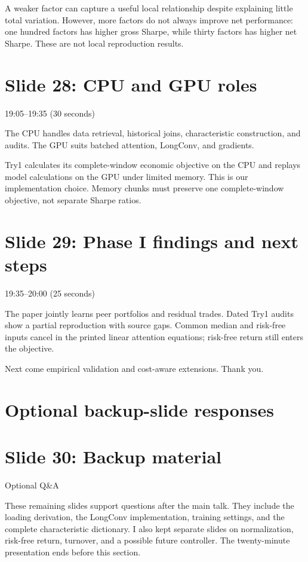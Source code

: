 \documentclass[11pt]{article}
\begin{document}
A weaker factor can capture a useful local relationship despite explaining little total variation. However, more factors do not always improve net performance: one hundred factors has higher gross Sharpe, while thirty factors has higher net Sharpe. These are not local reproduction results.

\section*{Slide 28: CPU and GPU roles}

\textcolor{SBred}{19:05--19:35 (30 seconds)}

The CPU handles data retrieval, historical joins, characteristic construction, and audits. The GPU suits batched attention, LongConv, and gradients.

Try1 calculates its complete-window economic objective on the CPU and replays model calculations on the GPU under limited memory. This is our implementation choice. Memory chunks must preserve one complete-window objective, not separate Sharpe ratios.

\section*{Slide 29: Phase I findings and next steps}

\textcolor{SBred}{19:35--20:00 (25 seconds)}

The paper jointly learns peer portfolios and residual trades. Dated Try1 audits show a partial reproduction with source gaps. Common median and risk-free inputs cancel in the printed linear attention equations; risk-free return still enters the objective.

Next come empirical validation and cost-aware extensions. Thank you.

\clearpage\section*{Optional backup-slide responses}

\section*{Slide 30: Backup material}

\textcolor{SBred}{Optional Q\&A}

These remaining slides support questions after the main talk. They include the loading derivation, the LongConv implementation, training settings, and the complete characteristic dictionary. I also kept separate slides on normalization, risk-free return, turnover, and a possible future controller. The twenty-minute presentation ends before this section.
\end{document}
